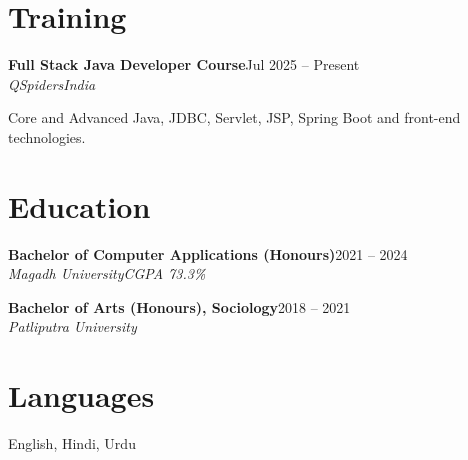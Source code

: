 \documentclass[10pt,a4paper]{article}
\newcommand{\role}[4]{%
  \textbf{#1}\hfill #2\\
  {\color{soft}\textit{#3}}\hfill{\color{soft}\textit{#4}}\par}
\begin{document}
\section{Training}
\role{Full Stack Java Developer Course}{Jul 2025 -- Present}{QSpiders}{India}
{\small Core and Advanced Java, JDBC, Servlet, JSP, Spring Boot and front-end technologies.}

\section{Education}
\role{Bachelor of Computer Applications (Honours)}{2021 -- 2024}{Magadh University}{CGPA 73.3\%}
\vspace{3pt}
\role{Bachelor of Arts (Honours), Sociology}{2018 -- 2021}{Patliputra University}{}

\section{Languages}
English, Hindi, Urdu
\end{document}

